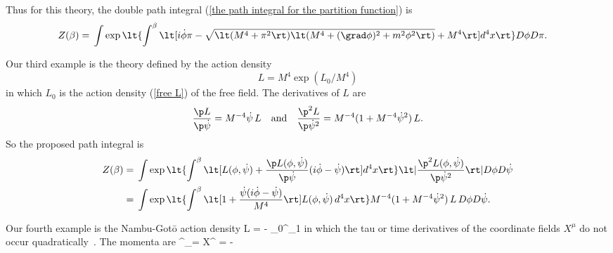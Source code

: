 \documentclass[prd,preprint,floatfix,showpacs]{revtex4-1}
\begin{document}
Thus for this theory,
the double path integral
(\ref {the path integral for the partition function}) is
\begin{equation}
   \begin{split}
Z(\beta)
={}& \int \exp \lt\{ \int^\beta \lt[ i \dot \phi \pi  {} 
- \sqrt{\lt(M^4 + \pi^2\rt)\lt(M^4 
+ (\grad \phi)^2 + m^2 \phi^2\rt)} + M^4
\rt] d^4x \rt\} D\phi D\pi .
\label {Born-Infeld path integral}
   \end{split}
\end{equation}

\par
Our third example is the theory
defined by the action density
\begin{equation}
L = M^4 \exp( L_0/M^4 )
\label {exponential action}
\end{equation}
in which \( L_0 \) is the action
density (\ref {free L}) of the free field.
The derivatives
of \( L \) are
\begin{equation}
\frac{\p L}{\p \dot \psi} = M^{-4} \dot \psi \, L
\quad \mbox{and} \quad
\frac{\p^2 L}{\p \dot \psi^2}
= M^{-4} ( 1 + M^{-4} \dot \psi^2 ) \, L .
\end{equation}
So the proposed path integral is
\begin{equation}
\begin{split}
Z(\beta) = {}&
\int \exp \lt\{ \int^\beta \lt[ L(\phi, \dot \psi) 
+ \frac{ \p  L(\phi, \dot \psi) }{ \p \dot \psi } 
( i \dot \phi - \dot \psi )
\rt] d^4x \rt\} 
\lt| \frac{\p^2 L(\phi, \dot \psi) }
{\p \dot \psi^2} \rt| 
D\phi D\dot\psi  \\
={}& \int \exp \lt\{ \int^\beta   \lt[ 1
+ \frac{ \dot \psi 
( i \dot \phi - \dot \psi ) }
{M^4}
\rt] L(\phi, \dot \psi) \, d^4x \rt\} 
M^{-4} ( 1 + M^{-4} \dot \psi^2 ) \, L
 \,
D\phi D\dot\psi .
\label {basic path integral pi psi exponential}
\end{split}
\end{equation}
\par
Our fourth example is 
the Nambu-Got{\={o}} 
action density
\beq
L = - 
\int_0^{\sigma_1}
\label {Nambu Goto L}
\eeq
in which the tau or time derivatives
of the coordinate fields \( X^\mu \)
do not occur quadratically~\cite{CahillXIX}.
The momenta are
\beq
{}^\tau_\mu = 
{\partial \dot X^\mu} =
-  
{}
\label {Ptaumu}
\end{document}
